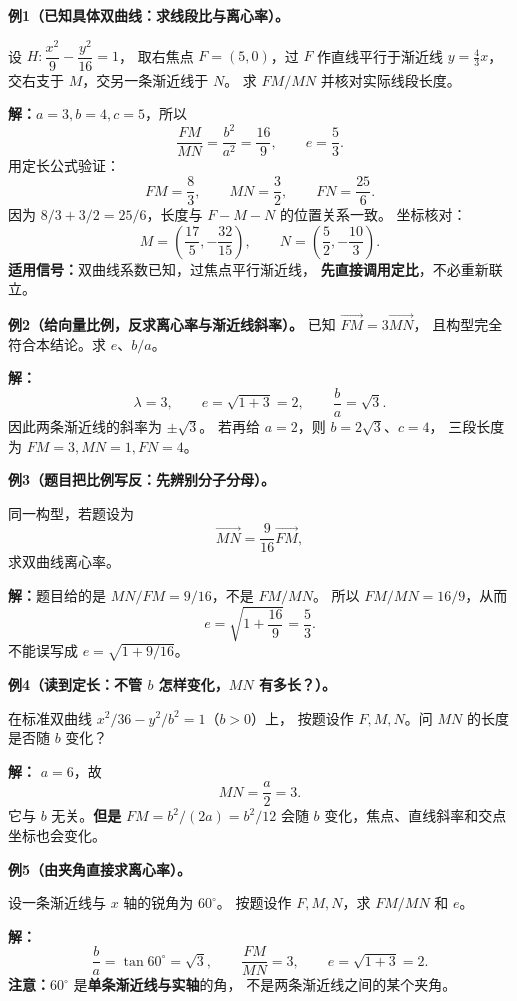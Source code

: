 \clearpage
\begin{examplebox}
\textbf{例1（已知具体双曲线：求线段比与离心率）。}

设 $H:\dfrac{x^2}{9}-\dfrac{y^2}{16}=1$，
取右焦点 $F=(5,0)$，过 $F$ 作直线平行于渐近线 $y=\frac43x$，
交右支于 $M$，交另一条渐近线于 $N$。
求 $FM/MN$ 并核对实际线段长度。

\textbf{解：}$a=3,b=4,c=5$，所以
\[
\boxed{\frac{FM}{MN}=\frac{b^2}{a^2}=\frac{16}{9}},
\qquad\boxed{e=\frac53}.
\]
用定长公式验证：
\[
\boxed{FM=\frac{8}{3}},\qquad
\boxed{MN=\frac32},\qquad
\boxed{FN=\frac{25}{6}}.
\]
因为 $8/3+3/2=25/6$，长度与 $F-M-N$ 的位置关系一致。
坐标核对：
\[
\boxed{M=\left(\frac{17}{5},-\frac{32}{15}\right)},
\qquad
\boxed{N=\left(\frac52,-\frac{10}{3}\right)}.
\]
\textbf{适用信号：}双曲线系数已知，过焦点平行渐近线，
\textbf{先直接调用定比}，不必重新联立。

\medskip
\textbf{例2（给向量比例，反求离心率与渐近线斜率）。}
已知 $\overrightarrow{FM}=3\overrightarrow{MN}$，
且构型完全符合本结论。求 $e$、$b/a$。

\textbf{解：}
\[
\lambda=3,\qquad e=\sqrt{1+3}=\boxed2,
\qquad\frac ba=\sqrt3.
\]
因此两条渐近线的斜率为 $\boxed{\pm\sqrt3}$。
若再给 $a=2$，则 $b=2\sqrt3$、$c=4$，
三段长度为 $FM=3,MN=1,FN=4$。
\end{examplebox}

\clearpage
\begin{examplebox}
\textbf{例3（题目把比例写反：先辨别分子分母）。}

同一构型，若题设为
\[
\overrightarrow{MN}=\frac9{16}\overrightarrow{FM},
\]
求双曲线离心率。

\textbf{解：}题目给的是 $MN/FM=9/16$，不是 $FM/MN$。
所以 $FM/MN=16/9$，从而
\[
\boxed{e=\sqrt{1+\frac{16}{9}}=\frac53}.
\]
不能误写成 $e=\sqrt{1+9/16}$。

\medskip
\textbf{例4（读到定长：不管 $b$ 怎样变化，$MN$ 有多长？）。}

在标准双曲线 $x^2/36-y^2/b^2=1$（$b>0$）上，
按题设作 $F,M,N$。问 $MN$ 的长度是否随 $b$ 变化？

\textbf{解：} $a=6$，故
\[
\boxed{MN=\frac a2=3}.
\]
它与 $b$ 无关。\textbf{但是} $FM=b^2/(2a)=b^2/12$
会随 $b$ 变化，焦点、直线斜率和交点坐标也会变化。

\medskip
\textbf{例5（由夹角直接求离心率）。}

设一条渐近线与 $x$ 轴的锐角为 $60^\circ$。
按题设作 $F,M,N$，求 $FM/MN$ 和 $e$。

\textbf{解：}
\[
\frac ba=\tan60^\circ=\sqrt3,
\qquad\boxed{\frac{FM}{MN}=3},
\qquad\boxed{e=\sqrt{1+3}=2}.
\]
\textbf{注意：}$60^\circ$ 是\textbf{单条渐近线与实轴}的角，
不是两条渐近线之间的某个夹角。
\end{examplebox}

